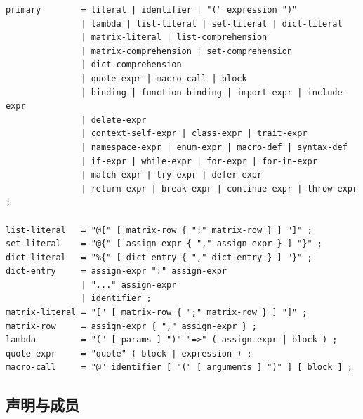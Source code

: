 \documentclass[UTF8,12pt]{ctexart}
\begin{document}
\begin{lstlisting}
primary        = literal | identifier | "(" expression ")"
               | lambda | list-literal | set-literal | dict-literal
               | matrix-literal | list-comprehension
               | matrix-comprehension | set-comprehension
               | dict-comprehension
               | quote-expr | macro-call | block
               | binding | function-binding | import-expr | include-expr
               | delete-expr
               | context-self-expr | class-expr | trait-expr
               | namespace-expr | enum-expr | macro-def | syntax-def
               | if-expr | while-expr | for-expr | for-in-expr
               | match-expr | try-expr | defer-expr
               | return-expr | break-expr | continue-expr | throw-expr ;

list-literal   = "@[" [ matrix-row { ";" matrix-row } ] "]" ;
set-literal    = "@{" [ assign-expr { "," assign-expr } ] "}" ;
dict-literal   = "%{" [ dict-entry { "," dict-entry } ] "}" ;
dict-entry     = assign-expr ":" assign-expr
               | "..." assign-expr
               | identifier ;
matrix-literal = "[" [ matrix-row { ";" matrix-row } ] "]" ;
matrix-row     = assign-expr { "," assign-expr } ;
lambda         = "(" [ params ] ")" "=>" ( assign-expr | block ) ;
quote-expr     = "quote" ( block | expression ) ;
macro-call     = "@" identifier [ "(" [ arguments ] ")" ] [ block ] ;
\end{lstlisting}

\subsection{声明与成员}
\end{document}
